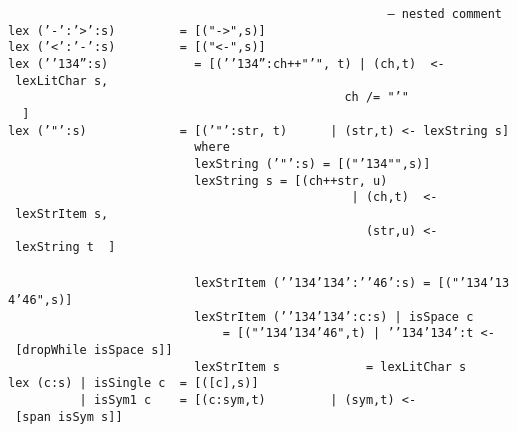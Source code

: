 \mbox{\tt \ \ \ \ \ \ \ \ \ \ \ \ \ \ \ \ \ \ \ \ \ \ \ \ \ \ \ \ \ \ \ \ \ \ \ \ \ \ \ \ \ \ \ \ \ \ \ \ \ \ \ \ \ --\ nested\ comment}
\eprogB\noindent\bprogB
\mbox{\tt lex\ ('-':'>':s)\ \ \ \ \ \ \ \ \ =\ [("->",s)]}\\
\mbox{\tt lex\ ('<':'-':s)\ \ \ \ \ \ \ \ \ =\ [("<-",s)]}\\
\mbox{\tt lex\ ('{\char'134}'':s)\ \ \ \ \ \ \ \ \ \ \ \ =\ [('{\char'134}'':ch++"'",\ t)\ |\ (ch,t)\ \ <-\ lexLitChar\ s,}\\
\mbox{\tt \ \ \ \ \ \ \ \ \ \ \ \ \ \ \ \ \ \ \ \ \ \ \ \ \ \ \ \ \ \ \ \ \ \ \ \ \ \ \ \ \ \ \ \ \ \ \ ch\ /=\ "'"\ \ \ \ \ \ \ \ \ \ \ \ \ \ \ \ ]}\\
\mbox{\tt lex\ ('"':s)\ \ \ \ \ \ \ \ \ \ \ \ \ =\ [('"':str,\ t)\ \ \ \ \ \ |\ (str,t)\ <-\ lexString\ s]}\\
\mbox{\tt \ \ \ \ \ \ \ \ \ \ \ \ \ \ \ \ \ \ \ \ \ \ \ \ \ \ where}\\
\mbox{\tt \ \ \ \ \ \ \ \ \ \ \ \ \ \ \ \ \ \ \ \ \ \ \ \ \ \ lexString\ ('"':s)\ =\ [("{\char'134}"",s)]}\\
\mbox{\tt \ \ \ \ \ \ \ \ \ \ \ \ \ \ \ \ \ \ \ \ \ \ \ \ \ \ lexString\ s\ =\ [(ch++str,\ u)}\\
\mbox{\tt \ \ \ \ \ \ \ \ \ \ \ \ \ \ \ \ \ \ \ \ \ \ \ \ \ \ \ \ \ \ \ \ \ \ \ \ \ \ \ \ \ \ \ \ \ \ \ \ |\ (ch,t)\ \ <-\ lexStrItem\ s,}\\
\mbox{\tt \ \ \ \ \ \ \ \ \ \ \ \ \ \ \ \ \ \ \ \ \ \ \ \ \ \ \ \ \ \ \ \ \ \ \ \ \ \ \ \ \ \ \ \ \ \ \ \ \ \ (str,u)\ <-\ lexString\ t\ \ ]}\\
\mbox{\tt }\\[-8pt]
\mbox{\tt \ \ \ \ \ \ \ \ \ \ \ \ \ \ \ \ \ \ \ \ \ \ \ \ \ \ lexStrItem\ ('{\char'134}{\char'134}':'{\char'46}':s)\ =\ [("{\char'134}{\char'134}{\char'46}",s)]}\\
\mbox{\tt \ \ \ \ \ \ \ \ \ \ \ \ \ \ \ \ \ \ \ \ \ \ \ \ \ \ lexStrItem\ ('{\char'134}{\char'134}':c:s)\ |\ isSpace\ c}\\
\mbox{\tt \ \ \ \ \ \ \ \ \ \ \ \ \ \ \ \ \ \ \ \ \ \ \ \ \ \ \ \ \ \ =\ [("{\char'134}{\char'134}{\char'46}",t)\ |\ '{\char'134}{\char'134}':t\ <-\ [dropWhile\ isSpace\ s]]}\\
\mbox{\tt \ \ \ \ \ \ \ \ \ \ \ \ \ \ \ \ \ \ \ \ \ \ \ \ \ \ lexStrItem\ s\ \ \ \ \ \ \ \ \ \ \ \ =\ lexLitChar\ s}
\eprogB\noindent\bprogB
\mbox{\tt lex\ (c:s)\ |\ isSingle\ c\ \ =\ [([c],s)]}\\
\mbox{\tt \ \ \ \ \ \ \ \ \ \ |\ isSym1\ c\ \ \ \ =\ [(c:sym,t)\ \ \ \ \ \ \ \ \ |\ (sym,t)\ <-\ [span\ isSym\ s]]}\\
